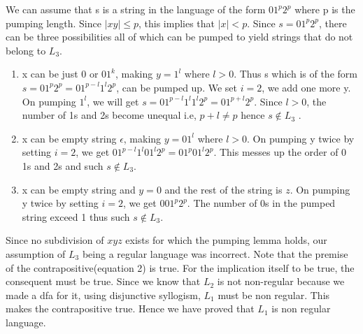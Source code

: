 \documentclass[a4page]{exam}
\begin{document}
\begin{questions}
\begin{parts}
\begin{solution}
      We can assume that s is a string in the language of the form $01^p2^p$ where p is the pumping length. 
      Since $|xy| \leq p$, this implies that $|x| < p$. Since $s = 01^p2^p$, there can be three possibilities all of which can be pumped to yield strings that do not belong to $L_3$.
      \begin{enumerate}
      \item x can be just $0$ or $01^k$, making $y = 1^l$ where $l>0$. Thus s which is of the form $s = 01^p2^p = 01^{p-l}1^l2^p$, can be pumped up. We set $i=2$, we add one more y. On pumping $1^l$, we will get $s = 01^{p-l}1^l1^l2^p = 01^{p+l}2^p$. Since $l>0$, the number of 1s and 2s become unequal i.e, $p+l \neq p$ hence $s \not \in L_3$ .
      \item x can be empty string $\epsilon$, making $y=01^l$ where $l>0$. On pumping y twice by setting $i=2$, we get $01^{p-l}1^l01^l2^p = 01^p01^l2^p$. This messes up the order of 0 1s and 2s and such $s \not \in L_3$.
      \item x can be empty string and $y=0$ and the rest of the string is $z$.  On pumping y twice by setting $i=2$, we get $001^p2^p$. The number of 0s in the pumped string exceed 1 thus such $s \not \in L_3$.
      \end{enumerate}
      Since no subdivision of $xyz$ exists for which the pumping lemma holds, our assumption of $L_3$ being a regular language was incorrect. Note that the premise of the contrapositive(equation 2) is true. For the implication itself to be true, the consequent must be true. Since we know that $L_2$ is not non-regular because we made a dfa for it, using disjunctive syllogism, $L_1$ must be non regular. This makes the contrapositive true. Hence we have proved that $L_1$ is non regular language.\\\\
    \end{solution}


\end{parts}
\end{questions}
\end{document}
